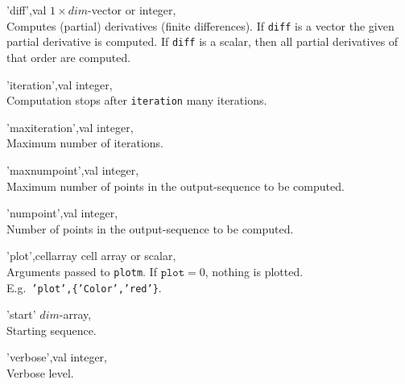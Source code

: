 \begin{param}

\item['diff',val]                  $1 \times dim$-vector or integer, \\
    Computes (partial) derivatives (finite differences). If \texttt{diff} is a vector the given partial derivative is computed. 
    If \texttt{diff} is a scalar, then all partial derivatives of that order are computed.
    


\item['iteration',val]             integer, \\
                                   Computation stops after \texttt{iteration} many iterations.

\item['maxiteration',val]          integer, \\ Maximum number of iterations.

\item['maxnumpoint',val]           integer, \\ Maximum number of points in the output-sequence to be computed.

\item['numpoint',val]              integer, \\ Number of points in the output-sequence to be computed.

\item['plot',cellarray]            cell array or scalar, \\
                                   Arguments passed to \texttt{plotm}.
                                   If $\texttt{plot}=0$, nothing is plotted.\\
                                   E.g.\ \texttt{'plot',\{'Color','red'\}}.

\item['start']                     $dim$-array, \\ Starting sequence.

\item['verbose',val]               integer, \\Verbose level.

\end{param}

